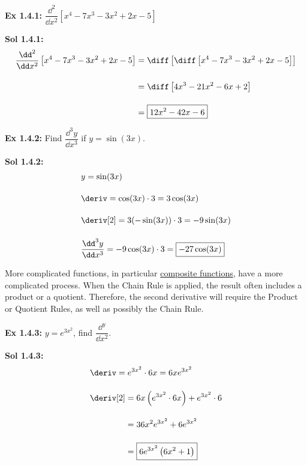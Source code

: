 \begin{tcolorbox}[example]
    \textbf{Ex 1.4.1: } $\dfrac{\dd ^2}{\dd x^2} \left[x^4 - 7x^3 - 3x^2 + 2x - 5\right]$
\end{tcolorbox}
\begin{tcolorbox}[solution]
    \textbf{Sol 1.4.1: } \begin{align*}
        \dfrac{\dd ^2}{\dd x^2} \left[x^4 - 7x^3 - 3x^2 + 2x - 5\right] &= \diff \left[\diff \left[x^4 - 7x^3 - 3x^2 + 2x - 5\right]\right] \\[11pt]
        & = \diff \left[4x^3 - 21x^2 - 6x + 2\right] \\[11pt]
        & = \boxed{12x^2 - 42x - 6}
    \end{align*}
\end{tcolorbox} \vspace{11pt}
 
\begin{tcolorbox}[example]
    \textbf{Ex 1.4.2: } Find $\dfrac{\dd ^3y}{\dd x^3}$ if $y = \sin (3x)$.
\end{tcolorbox} 
\begin{tcolorbox}[solution]
    \textbf{Sol 1.4.2: } \begin{align*}
        & y = \sin (3x) \\[11pt]
        & \deriv = \cos (3x) \cdot 3 = 3\cos (3x) \\[11pt]
        & \deriv[2] = 3(-\sin (3x)) \cdot 3 = -9\sin (3x) \\[11pt]
        & \dfrac{\dd ^3y}{\dd x^3} = -9\cos (3x) \cdot 3 = \boxed{-27\cos (3x)}
    \end{align*}
\end{tcolorbox}

More complicated functions, in particular \hyperlink{Composite Function}{composite functions}, have a more complicated process. When the Chain Rule is applied, the result often includes a product or a quotient. Therefore, the second derivative will require the Product or Quotient Rules, as well as possibly the Chain Rule. \par

\begin{tcolorbox}[example]
    \textbf{Ex 1.4.3: } $y = e^{3x^2}$, find $\dfrac{\dd ^y}{\dd x^2}$. 
\end{tcolorbox}
\begin{tcolorbox}[solution]
    \textbf{Sol 1.4.3: }\begin{align*}
        & \deriv = e^{3x^2} \cdot 6x = 6xe^{3x^2} \\[11pt]
        & \deriv[2] \begin{aligned}[t]
            & = 6x\left(e^{3x^2} \cdot 6x\right) + e^{3x^2} \cdot 6 \\[11pt]
            & = 36x^2e^{3x^2} + 6e^{3x^2} \\[11pt]
            & = \boxed{6e^{3x^2}\left(6x^2 + 1\right)}
        \end{aligned}
    \end{align*}
\end{tcolorbox} \vspace{11pt}

